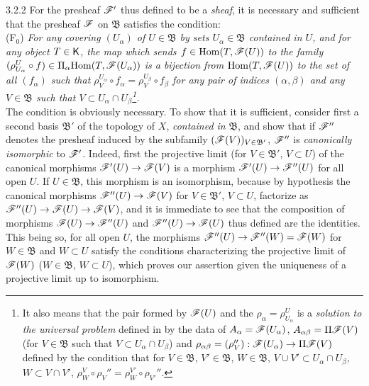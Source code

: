 \begin{env}{3.2.2}
\label{env-0.3.2.2}
For the presheaf $\mathscr{F}'$ thus defined to be a \emph{sheaf}, it is necessary
and sufficient that the presheaf $\mathscr{F}$ on $\mathfrak{B}$ satisfies the
condition:\\

(F$_0$) \emph{For any covering $(U_\alpha)$ of $U\in\mathfrak{B}$ by sets
        $U_\alpha\in\mathfrak{B}$ contained in $U$, and for any object $T\in\mathsf{K}$,
        the map which sends $f\in{\mathop{\mathrm{Hom}}\nolimits}(T,\mathscr{F}(U))$ to the family
        $(\rho_{U_\alpha}^U\circ f)\in\Pi_\alpha{\mathop{\mathrm{Hom}}\nolimits}(T,\mathscr{F}(U_\alpha))$ is a
        bijection from ${\mathop{\mathrm{Hom}}\nolimits}(T,\mathscr{F}(U))$ to the set of all $(f_\alpha)$ such
        that $\rho_V^{U_\alpha}\circ f_\alpha=\rho_V^{U_\beta}\circ f_\beta$ for
        any pair of indices $(\alpha,\beta)$ and any $V\in\mathfrak{B}$ such
        that $V\subset U_\alpha\cap U_\beta$\footnote{It also means that the
        pair formed by $\mathscr{F}(U)$ and the $\rho_\alpha=\rho_{U_\alpha}^U$ is a
        \emph{solution to the universal problem} defined in  by
        the data of $A_\alpha=\mathscr{F}(U_\alpha)$, $A_{\alpha\beta}=\Pi\mathscr{F}(V)$
        (for $V\in\mathfrak{B}$ such that $V\subset U_\alpha\cap U_\beta$) and
        $\rho_{\alpha\beta}=(\rho_V''):\mathscr{F}(U_\alpha)\to\Pi\mathscr{F}(V)$ defined
        by the condition that for $V\in\mathfrak{B}$, $V'\in\mathfrak{B}$,
        $W\in\mathfrak{B}$, $V\cup V'\subset U_\alpha\cap U_\beta$,
        $W\subset V\cap V'$,
        $\rho_W^V\circ\rho_V''=\rho_W^{V'}\circ\rho_{V'}''$.}.}\\

The condition is obviously necessary. To show that it is sufficient, consider
first a second basis $\mathfrak{B}'$ of the topology of $X$, \emph{contained in}
$\mathfrak{B}$, and show that if $\mathscr{F}''$ denotes the presheaf induced by the
subfamily $(\mathscr{F}(V))_{V\in\mathfrak{B}'}$, $\mathscr{F}''$ is \emph{canonically
isomorphic} to $\mathscr{F}'$. Indeed, first the projective limit (for
$V\in\mathfrak{B}'$, $V\subset U$) of the canonical morphisms
$\mathscr{F}'(U)\to\mathscr{F}(V)$ is a morphism $\mathscr{F}'(U)\to\mathscr{F}''(U)$ for all open
$U$. If $U\in\mathfrak{B}$, this morphism is an isomorphism, because by
hypothesis the canonical morphisms $\mathscr{F}''(U)\to\mathscr{F}(V)$ for
$V\in\mathfrak{B}'$, $V\subset U$, factorize as
$\mathscr{F}''(U)\to\mathscr{F}(U)\to\mathscr{F}(V)$, and it is immediate to see that the
composition of morphisms $\mathscr{F}(U)\to\mathscr{F}''(U)$ and $\mathscr{F}''(U)\to\mathscr{F}(U)$
thus defined are the identities. This being so, for all open $U$, the morphisms
$\mathscr{F}''(U)\to\mathscr{F}''(W)=\mathscr{F}(W)$ for $W\in\mathfrak{B}$ and $W\subset U$
satisfy the conditions characterizing the projective limit of $\mathscr{F}(W)$
($W\in\mathfrak{B}$, $W\subset U$), which proves our assertion given the
uniqueness of a projective limit up to isomorphism.


\end{env}
